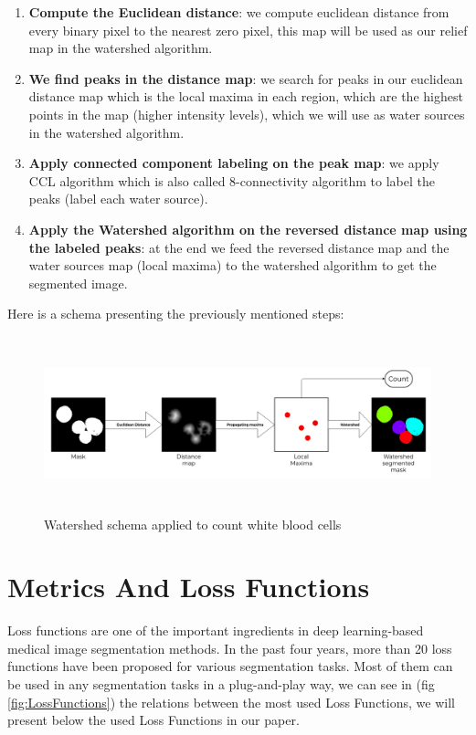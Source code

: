 \begin{enumerate}
    \item \textbf{Compute the Euclidean distance}: we compute euclidean distance from every binary pixel to the nearest zero pixel, this map will be used as our relief map in the watershed algorithm.
    \item \textbf{We find peaks in the distance map}: we search for peaks in our euclidean distance map which is the local maxima in each region, which are the highest points in the map (higher intensity levels), which we will use as water sources in the watershed algorithm.
    \item \textbf{Apply connected component labeling on the peak map}: we apply CCL algorithm which is also called 8-connectivity algorithm to label the peaks (label each water source).
    \item \textbf{Apply the Watershed algorithm on the reversed distance map using the labeled peaks}: at the end we feed the reversed distance map and the water sources map (local maxima) to the watershed algorithm to get the segmented image. 
\end{enumerate}

Here is a schema presenting the previously mentioned steps:

\begin{figure}[H]
\centering
  \vspace{-0.1in}
    \centerline{\includegraphics[width = 7in, height = 2in]{../images/watershed.png}}
    \caption{Watershed schema applied to count white blood cells}
\end{figure}

\section{Metrics And Loss Functions}
\hspace{\parindent}
Loss functions are one of the important ingredients in deep learning-based medical image segmentation methods. In the past four years, more than 20 loss functions have been proposed for various segmentation tasks. Most of them can be used in any segmentation tasks in a plug-and-play way, we can see in (fig \ref{fig:LossFunctions}) the relations between the most used  Loss Functions, we will present below the used Loss Functions in our paper.

